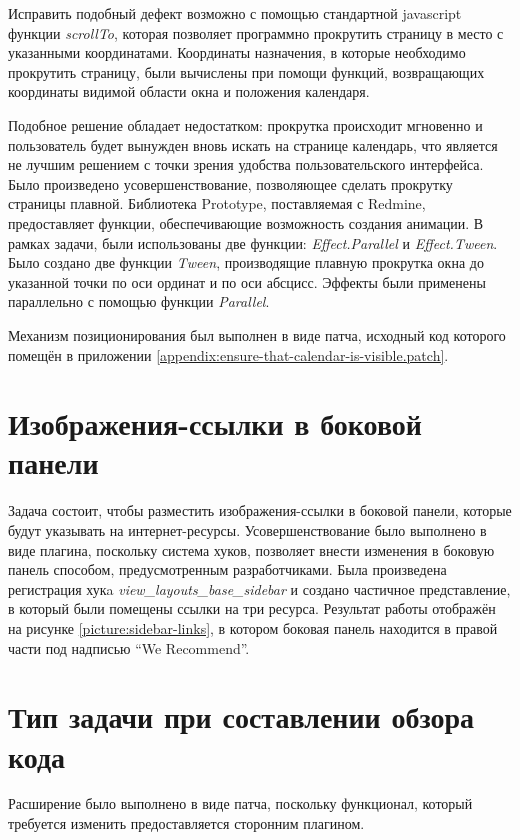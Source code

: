 Исправить подобный дефект возможно с помощью стандартной javascript
функции \textit{scrollTo}, которая позволяет программно прокрутить
страницу в место с указанными координатами. Координаты назначения, в которые
необходимо прокрутить страницу, были вычислены при помощи функций,
возвращающих координаты видимой области окна и положения календаря.

Подобное решение обладает недостатком: прокрутка происходит мгновенно и
пользователь будет вынужден вновь искать на странице календарь, что является не
лучшим решением с точки зрения удобства пользовательского интерфейса.
Было произведено усовершенствование, позволяющее сделать прокрутку страницы плавной.
Библиотека Prototype, поставляемая с Redmine, предоставляет функции,
обеспечивающие возможность создания анимации. В рамках задачи, были
использованы две функции: \textit{Effect.Parallel} и \textit{Effect.Tween}.
Было создано две функции \textit{Tween}, производящие плавную прокрутка окна до
указанной точки по оси ординат и по оси абсцисс. Эффекты были применены
параллельно с помощью функции \textit{Parallel}.

Механизм позиционирования был выполнен в виде патча, исходный код
которого помещён в приложении
\ref{appendix:ensure-that-calendar-is-visible.patch}.

\section{Изображения-ссылки в боковой панели}
Задача состоит, чтобы разместить изображения-ссылки в боковой панели, которые
будут указывать на интернет-ресурсы. Усовершенствование было выполнено в виде
плагина, поскольку система хуков, позволяет внести изменения в боковую панель
способом, предусмотренным разработчиками. Была произведена регистрация хукa
\textit{view\_layouts\_base\_sidebar} и создано частичное представление, в
который были помещены ссылки на три ресурса. Результат работы отображён на
рисунке \ref{picture:sidebar-links}, в котором боковая панель находится в
правой части под надписью ``We Recommend''.



\section{Тип задачи при составлении обзора кода}
Расширение было выполнено в виде патча, поскольку функционал, который требуется
изменить предоставляется сторонним плагином.

